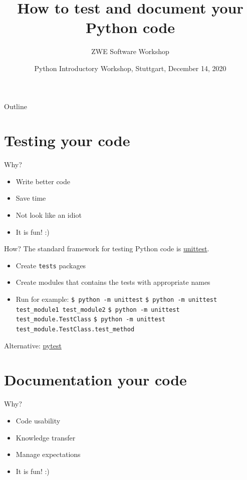\documentclass[compress,english,aspectratio=1610]{beamer}
\title{How to test and document your Python code}
\author{ZWE Software Workshop}
\institute{Max-Planck-Institut f\"ur Intelligente Systeme}
\date{\small{Python Introductory Workshop, Stuttgart, December 14, 2020}}
\let\olditem\item
\renewcommand{\item}{\setlength{\itemsep}{\fill}\olditem}
\begin{document}
\begin{frame}[plain,label=thetitle]
 \titlepage
\end{frame}



\begin{frame}{Outline}
	\tableofcontents
\end{frame}

\section{Testing your code}
\begin{frame}{Why?}
    \begin{itemize}
        \item Write better code
        \item Save time
        \item Not look like an idiot
        \item It is fun! :)
    \end{itemize}
\end{frame}

\begin{frame}{How?}
    The standard framework for testing Python code is
    \href{https://docs.python.org/3/library/unittest.html}{unittest}.
    \begin{itemize}
        \item Create {\tt tests} packages
        \item Create modules that contains the tests with appropriate names
        \item Run for example: \newline
        {\tt \$ python -m unittest} \newline
        {\tt \$ python -m unittest test\_module1 test\_module2} \newline
        {\tt \$ python -m unittest test\_module.TestClass} \newline
        {\tt \$ python -m unittest test\_module.TestClass.test\_method} \newline
    \end{itemize}

    Alternative: \href{https://docs.pytest.org/en/stable/}{pytest}
\end{frame}

\section{Documentation your code}
\begin{frame}{Why?}
    \begin{itemize}
        \item Code usability
        \item Knowledge transfer
        \item Manage expectations
        \item It is fun! :)
    \end{itemize}
\end{frame}
\end{document}
